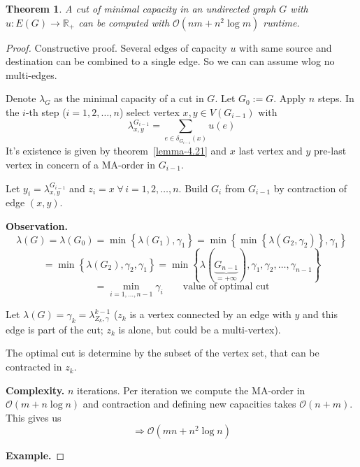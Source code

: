 \documentclass{article}
\newtheorem{theorem}{Theorem}
\newcommand{\set}[1]{\left\{#1\right\}}
\newcommand{\fall}{\;\forall\,}
\begin{document}
\begin{theorem}\label{satz-4.22}
  A cut of minimal capacity in an undirected graph $G$ with $u: E(G) \rightarrow \mathbb{R}_+$ can be computed with $\mathcal{O}(nm + n^2 \log{m})$ runtime.
\end{theorem}

\begin{proof}
  Constructive proof.
  Several edges of capacity $u$ with same source and destination can be combined to a single edge.
  So we can can assume wlog no multi-edges.

  Denote $\lambda_G$ as the minimal capacity of a cut in $G$. Let $G_0 := G$. Apply $n$ steps.
  In the $i$-th step ($i = 1, 2, \ldots, n$) select vertex $x, y \in V(G_{i-1})$ with
  \[
    \lambda^{G_{i-1}}_{x,y} = \sum_{e \in \delta_{G_{i-1}}(x)} u(e)
  \]
  It's existence is given by theorem~\ref{lemma-4.21} and $x$ last vertex and $y$ pre-last vertex in concern of a MA-order in $G_{i-1}$.

  Let $y_i = \lambda^{G_{i-1}}_{x,y}$ and $z_i = x \fall i = 1, 2, \ldots, n$.
  Build $G_i$ from $G_{i-1}$ by contraction of edge $(x, y)$.

  \textbf{Observation.}
    \[
      \lambda(G) = \lambda(G_0) = \min{\set{\lambda(G_1), \gamma_1}}
        = \min{\set{\min{\set{\lambda(G_2, \gamma_2)}, \gamma_1}}}
    \] \[
        = \min{\set{\lambda(G_2), \gamma_2, \gamma_1}}
        = \min{\set{\lambda(\underbrace{G_{n-1}}_{=+\infty}), \gamma_1, \gamma_2, \ldots, \gamma_{n-1}}}
    \] \[
        = \min_{i=1,\ldots,n-1} \gamma_i \qquad \text{value of optimal cut}
    \]

    Let $\lambda(G) = \gamma_k = \lambda_{Z_k, \gamma}^{k-1}$ ($z_k$ is a vertex connected by an edge with $y$ and this edge is part of the cut; $z_k$ is alone, but could be a multi-vertex).

    The optimal cut is determine by the subset of the vertex set, that can be contracted in $z_k$.

  \textbf{Complexity.}
    $n$ iterations. Per iteration we compute the MA-order in $\mathcal{O}(m + n \log{n})$ and contraction and defining new capacities takes $\mathcal{O}(n+m)$. This gives us
    \[ \Rightarrow \mathcal{O}(mn + n^2 \log{n}) \]

  \textbf{Example.}


\end{proof}
\end{document}
